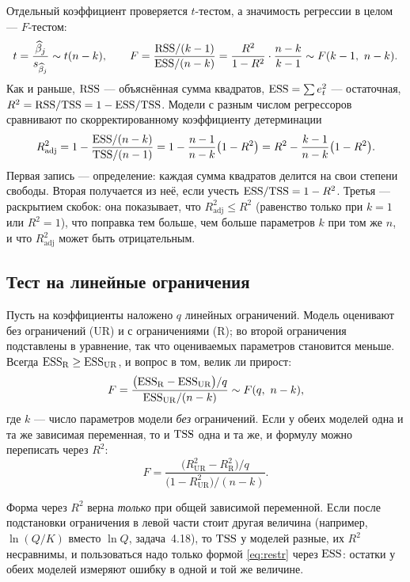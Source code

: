 Отдельный коэффициент проверяется $t$-тестом, а значимость регрессии в
целом — $F$-тестом:
\begin{equation}
  t = \frac{\widehat{\beta}_j}{s_{\widehat{\beta}_j}} \sim t(n-k),
  \qquad
  F = \frac{\mathrm{RSS}/(k-1)}{\mathrm{ESS}/(n-k)}
    = \frac{R^2}{1-R^2}\cdot\frac{n-k}{k-1} \sim F(k-1,\ n-k).
  \label{eq:tf}
\end{equation}
Как и раньше, $\mathrm{RSS}$ — объяснённая сумма квадратов, $\mathrm{ESS} = \sum e_t^2$ —
остаточная, $R^2 = \mathrm{RSS}/\mathrm{TSS} = 1 - \mathrm{ESS}/\mathrm{TSS}$. Модели с разным числом
регрессоров сравнивают по скорректированному коэффициенту детерминации
\begin{equation}
  R^2_{\text{adj}}
  = 1 - \frac{\mathrm{ESS}/(n-k)}{\mathrm{TSS}/(n-1)}
  = 1 - \frac{n-1}{n-k}\bigl(1 - R^2\bigr)
  = R^2 - \frac{k-1}{n-k}\bigl(1 - R^2\bigr).
  \label{eq:r2adj}
\end{equation}
Первая запись — определение: каждая сумма квадратов делится на свои степени
свободы. Вторая получается из неё, если учесть $\mathrm{ESS}/\mathrm{TSS} = 1 - R^2$. Третья —
раскрытием скобок: она показывает, что $R^2_{\text{adj}} \le R^2$ (равенство
только при $k = 1$ или $R^2 = 1$), что поправка тем больше, чем больше
параметров $k$ при том же $n$, и что $R^2_{\text{adj}}$ может быть
отрицательным.

\subsection{Тест на линейные ограничения}\label{sec:restr}

Пусть на коэффициенты наложено $q$ линейных ограничений. Модель оценивают
без ограничений (UR) и с ограничениями (R); во второй ограничения подставлены
в уравнение, так что оцениваемых параметров становится меньше. Всегда
$\mathrm{ESS}_{\mathrm{R}} \ge \mathrm{ESS}_{\mathrm{UR}}$, и вопрос в том, велик ли прирост:
\begin{equation}
  F = \frac{\bigl(\mathrm{ESS}_{\mathrm{R}} - \mathrm{ESS}_{\mathrm{UR}}\bigr)/q}
           {\mathrm{ESS}_{\mathrm{UR}}/(n-k)} \sim F(q,\ n-k),
  \label{eq:restr}
\end{equation}
где $k$ — число параметров модели \emph{без} ограничений. Если у обеих моделей
одна и та же зависимая переменная, то и $\mathrm{TSS}$ одна и та же, и формулу можно
переписать через $R^2$:
\[
  F = \frac{\bigl(R^2_{\mathrm{UR}} - R^2_{\mathrm{R}}\bigr)/q}
           {\bigl(1 - R^2_{\mathrm{UR}}\bigr)/(n-k)} .
\]

\begin{remark}
Форма через $R^2$ верна \emph{только} при общей зависимой переменной. Если
после подстановки ограничения в левой части стоит другая величина (например,
$\ln(Q/K)$ вместо $\ln Q$, задача~4.18), то $\mathrm{TSS}$ у моделей разные, их $R^2$
несравнимы, и пользоваться надо только формой \eqref{eq:restr} через $\mathrm{ESS}$:
остатки у обеих моделей измеряют ошибку в одной и той же величине.
\end{remark}

